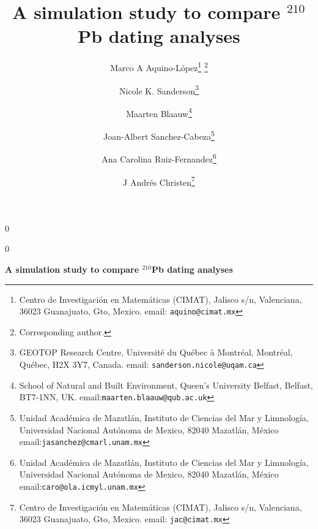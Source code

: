 \documentclass [10pt] {article}
\date{ }
\newcommand{\blind}{0}
\newcommand{\papertitle}{
 A simulation study to compare $^{210}$Pb dating analyses 
}
\begin{document}
	\def\spacingset#1{\renewcommand{\baselinestretch}%
		{#1}\small\normalsize} \spacingset{1}
	\blind
	{
		\title{\textbf{\papertitle}}

		\author{Marco A Aquino-L\'opez\thanks{
				Centro de Investigaci\'on en Matem\'aticas (CIMAT),
				Jalisco s/n, Valenciana, 36023 Guanajuato, Gto, Mexico.
				email: \texttt{aquino@cimat.mx} } \thanks{Corresponding author.}
					\and
			Nicole K. Sanderson\thanks{
				GEOTOP Research Centre, Université du Québec à Montréal, 
				Montréal, Québec, H2X 3Y7, Canada. 
				email: \texttt{sanderson.nicole@uqam.ca}}
					\and
			Maarten Blaauw\thanks{School of Natural and Built Environment,
				Queen's University Belfast,
				Belfast, BT7-1NN, UK.
				email:\texttt{maarten.blaauw@qub.ac.uk}  }
					\and
			Joan-Albert Sanchez-Cabeza\thanks{
				Unidad Acad\'emica de Mazatl\'an, 
				Instituto de Ciencias del Mar y Limnolog\'ia, 
				Universidad Nacional Aut\'onoma de Mexico, 
				82040 Mazatl\'an, M\'exico
				email:\texttt{jasanchez@cmarl.unam.mx}} 
					\and
			Ana Carolina Ruiz-Fernandez\thanks{
				Unidad Acad\'emica de Mazatl\'an, 
				Instituto de Ciencias del Mar y Limnolog\'ia, 
				Universidad Nacional Aut\'onoma de Mexico, 
				82040 Mazatl\'an, M\'exico
				email:\texttt{caro@ola.icmyl.unam.mx}} 

					\and
			J Andr\'es Christen\thanks{
				Centro de Investigaci\'on en Matem\'aticas (CIMAT),
				Jalisco s/n, Valenciana, 36023 Guanajuato, Gto, Mexico.
				email: \texttt{jac@cimat.mx}  }

			}
		\maketitle
	} \fi

	\blind
	{
		\bigskip
		\bigskip
		\bigskip
		\begin{center}
			{\LARGE\bf \papertitle}
		\end{center}
		\medskip
	} \fi
\end{document}
